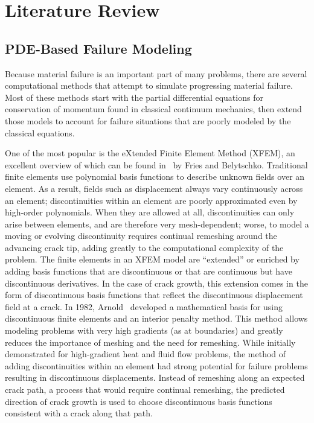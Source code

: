 \chapter{Literature Review}
\label{ch:LitReview}
\section{PDE-Based Failure Modeling}
Because material failure is an important part of many problems, there are several computational methods that attempt to simulate progressing material failure. 
Most of these methods start with the partial differential equations for conservation of momentum found in classical continuum mechanics, then extend those models to account for failure situations that are poorly modeled by the classical equations.

One of the most popular is the eXtended Finite Element Method (XFEM), an excellent overview of which can be found in~\cite{fries2010extended} by Fries and Belytschko.
Traditional finite elements use polynomial basis functions to describe unknown fields over an element.
As a result, fields such as displacement always vary continuously across an element; discontinuities within an element are poorly approximated even by high-order polynomials.
When they are allowed at all, discontinuities can only arise between elements, and are therefore very mesh-dependent; worse, to model a moving or evolving discontinuity requires continual remeshing around the advancing crack tip, adding greatly to the computational complexity of the problem.
The finite elements in an XFEM model are ``extended'' or enriched by adding basis functions that are discontinuous or that are continuous but have discontinuous derivatives. 
In the case of crack growth, this extension comes in the form of discontinuous basis functions that reflect the discontinuous displacement field at a crack.
In 1982, Arnold~\cite{arnold1982interior} developed a mathematical basis for using discontinuous finite elements and an interior penalty method.
This method allows modeling problems with very high gradients (as at boundaries) and greatly reduces the importance of meshing and the need for remeshing.
While initially demonstrated for high-gradient heat and fluid flow problems, the method of adding discontinuities within an element had strong potential for failure problems resulting in discontinuous displacements.
Instead of remeshing along an expected crack path, a process that would require continual remeshing, the predicted direction of crack growth is used to choose discontinuous basis functions consistent with a crack along that path.

